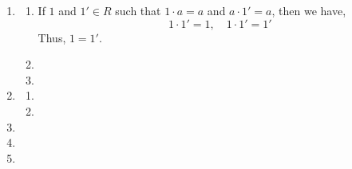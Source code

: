 \documentclass[Notebook.tex]{subfiles}
\begin{document}
\begin{solution}
	\bbni
	\begin{enumerate}[label=(\alph*),ref=\theenumi\alph*]
		\item
		\begin{enumerate}[label=(\roman*),ref=\theenumi\roman*]
			\item If $1$ and $1' \in R$ such that $1 \cdot a = a$ and $a \cdot 1' = a$, then we have, 
			\[1 \cdot 1' = 1, \quad 1 \cdot 1' = 1'\]
            Thus, $1 = 1'$. 
			\item
			\item
		\end{enumerate}
		\item
		\begin{enumerate}[label=(\roman*),ref=\theenumi\roman*]
			\item
			\item
		\end{enumerate}
		\item
		\item
		\item
	\end{enumerate}
\end{solution}

\newpage
\end{document}
